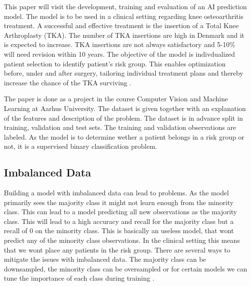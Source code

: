 
This paper will visit the development, training and evaluation of an AI prediction model. The model is to be used in a clinical setting regarding knee osteoarthritis treatment. A successful and effective treatment is the insertion of a Total Knee Arthroplasty (TKA). The number of TKA insertions are high in Denmark and it is expected to increase. TKA insertions are not always satisfactory and 5-10\% will need revision within 10 years. The objective of the model is indivdualized patient selection to identify patient's risk group. This enables optimization before, under and after surgery, tailoring  individual treatment plans and thereby increase the chance of the TKA surviving\cite{problem-description}   .           

The paper is done as a project in the course Computer Vision and Machine Learning at Aarhus University. The dataset is given together with an explanation of the features and description of the problem. The dataset is in advance split in training, validation and test sets. The training and validation observations are labeled. As the model is to determine wether a patient belongs in a risk group or not, it is a supervised binary classification problem.     

\subsection{Imbalanced Data}
Building a model with imbalanced data can lead to problems. As the model primarily sees the majority class it might not learn enough from the minority class. This can lead to a model predicting all new observations as the majority class. This will lead to a high accuracy and recall for the majority class but a recall of 0 on the minority class. This is basically an useless model, that wont predict any of the minority class observations. In the clinical setting this means that we wont place any patients in the risk group. There are several ways to mitigate the issues with imbalanced data. The majority class can be downsampled, the minority class can be oversampled or for certain models we can tune the importance of each class during training \cite*{svm-imbalanced-data}.

